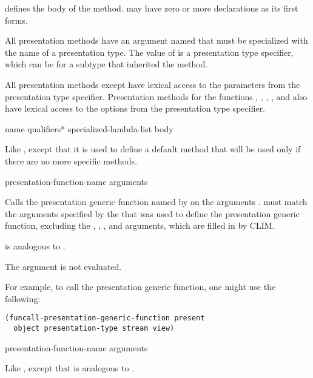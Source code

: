  defines the body of the method.   may have zero or more
declarations as its first forms.

All presentation methods have an argument named  that must be
specialized with the name of a presentation type.  The value of  is a
presentation type specifier, which can be for a subtype that inherited the
method.

All presentation methods except  have lexical access
to the parameters from the presentation type specifier.  Presentation methods
for the functions , , ,
, and  also have
lexical access to the options from the presentation type specifier.


 {name qualifiers* specialized-lambda-list
                                                \body body}

Like , except that it is used to define a default
method that will be used only if there are no more specific methods.

 {presentation-function-name \rest arguments}

Calls the presentation generic function named by 
on the arguments .   must match the arguments
specified by the  that was used to define
the presentation generic function, excluding the , ,
, and  arguments, which are filled in by CLIM.

 is analogous to .

The  argument is not evaluated.

For example, to call the  presentation generic function, one might
use the following:
\begin{verbatim}
(funcall-presentation-generic-function present
  object presentation-type stream view)
\end{verbatim}


 {presentation-function-name \rest arguments}

Like , except that
 is analogous to .

